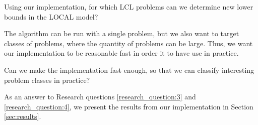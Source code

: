 \begin{researchquestion} \label{research_question:3}
Using our implementation, for which LCL problems can we determine new lower bounds in the LOCAL model?
\end{researchquestion}

The algorithm can be run with a single problem, but we also want to target classes of problems, where the quantity of problems can be large.
Thus, we want our implementation to be reasonable fast in order it to have use in practice.

\begin{researchquestion} \label{research_question:4}
Can we make the implementation fast enough, so that we can classify interesting problem classes in practice?
\end{researchquestion}

As an answer to Research questions \ref{research_question:3} and \ref{research_question:4}, we present the results from our implementation in Section \ref{sec:results}.
